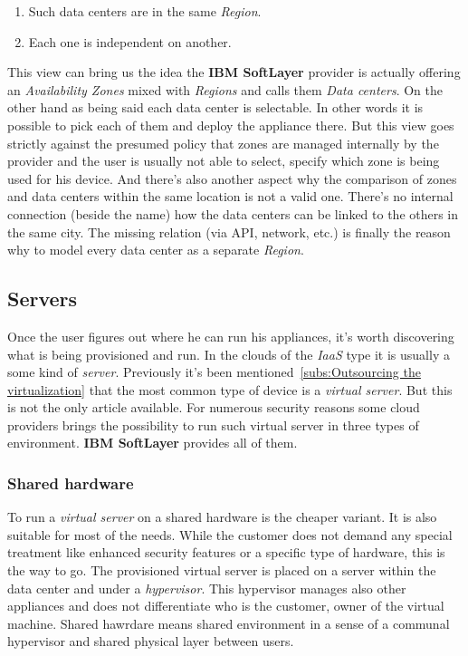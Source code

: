 \begin{enumerate}
	\item Such data centers are in the same \emph{Region}.
	\item Each one is independent on another.
\end{enumerate}

This view can bring us the idea the \textbf{IBM SoftLayer} provider is actually offering an \emph{Availability Zones} mixed with \emph{Regions} and calls them \emph{Data centers}. On the other hand as being said each data center is selectable. In other words it is possible to pick each of them and deploy the appliance there. But this view goes strictly against the presumed policy that zones are managed internally by the provider and the user is usually not able to select, specify which zone is being used for his device. And there's also another aspect why the comparison of zones and data centers within the same location is not a valid one. There's no internal connection (beside the name) how the data centers can be linked to the others in the same city. The missing relation (via API, network, etc.) is finally the reason why to model every data center as a separate \emph{Region}.

\subsection{Servers}
\label{sub:Servers}

Once the user figures out where he can run his appliances, it's worth discovering what is being provisioned and run. In the clouds of the \emph{IaaS} type it is usually a some kind of \emph{server}. Previously it's been mentioned~\ref{subs:Outsourcing the virtualization} that the most common type of device is a \emph{virtual server}. But this is not the only article available. For numerous security reasons some cloud providers brings the possibility to run such virtual server in three types of environment. \textbf{IBM SoftLayer} provides all of them.

\subsubsection{Shared hardware}
\label{subs:Shared hardware}

To run a \emph{virtual server} on a shared hardware is the cheaper variant. It is also suitable for most of the needs. While the customer does not demand any special treatment like enhanced security features or a specific type of hardware, this is the way to go. The provisioned virtual server is placed on a server within the data center and under a \emph{hypervisor}. This hypervisor manages also other appliances and does not differentiate who is the customer, owner of the virtual machine. Shared hawrdare means shared environment in a sense of a communal hypervisor and shared physical layer between users.

